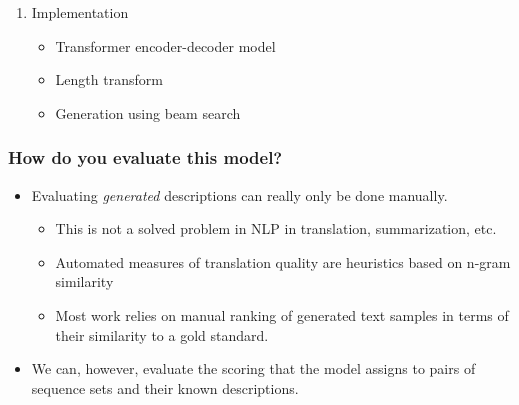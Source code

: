 \documentclass{beamer}
\begin{document}
\begin{frame}
\begin{enumerate}
\begin{itemize}
        \end{itemize}
    \item{Implementation}\pause
        \begin{itemize}
        \item{Transformer encoder-decoder model}\pause
        \item{Length transform}\pause
        \item{Generation using beam search}
        \end{itemize}
    \end{enumerate}
\end{frame}

\begin{frame}
    \frametitle{How do you evaluate this model?}
    \begin{itemize}
        \item Evaluating \textit{generated} descriptions can really only be done manually. \pause
            \begin{itemize}
                \item This is not a solved problem in NLP in translation, summarization, etc.\pause
                \item Automated measures of translation quality are heuristics based on n-gram similarity\pause
                \item Most work relies on manual ranking of generated text samples in terms of their similarity to a gold standard.\pause
            \end{itemize}
        \item We can, however, evaluate the scoring that the model assigns to pairs of sequence sets and their known descriptions.
    \end{itemize}
\end{frame}
\end{document}
